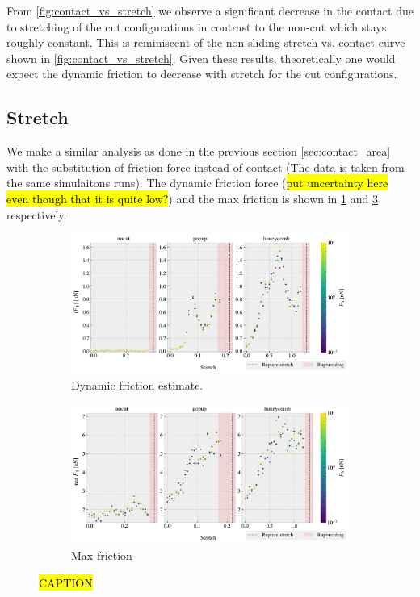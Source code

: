 From \cref{fig:contact_vs_stretch} we observe a significant decrease in the contact due to stretching of the cut configurations in contrast to the non-cut which stays roughly constant. This is reminiscent of the non-sliding stretch vs. contact curve shown in \cref{fig:contact_vs_stretch}. Given these results, theoretically one would expect the dynamic friction to decrease with stretch for the cut configurations.


\subsection{Stretch} 

We make a similar analysis as done in the previous section \cref{sec:contact_area} with the substitution of friction force instead of contact (The data is taken from the same simulaitons runs). The dynamic friction force (\hl{put uncertainty here even though that it is quite low?}) and the max friction is shown in \cref{fig:multi_stretch_mean_fric} and \cref{fig:multi_stretch_max_fric} respectively.



\begin{figure}[H]
  \centering
  \begin{subfigure}[t]{\textwidth}
      \centering
      \includegraphics[width=\textwidth]{figures/baseline/multi_stretch_mean_compare.pdf}
      \caption{Dynamic friction estimate. }
      \label{fig:multi_stretch_mean_fric}
  \end{subfigure}
  \hfill
  \begin{subfigure}[t]{\textwidth}
      \centering
      \includegraphics[width=\textwidth]{figures/baseline/multi_stretch_max_compare.pdf}
      \caption{Max friction}
      \label{fig:multi_stretch_max_fric}
  \end{subfigure}
  \hfill
     \caption{\hl{CAPTION}}
     \label{fig:multi_stretch_max_fric}
\end{figure}


